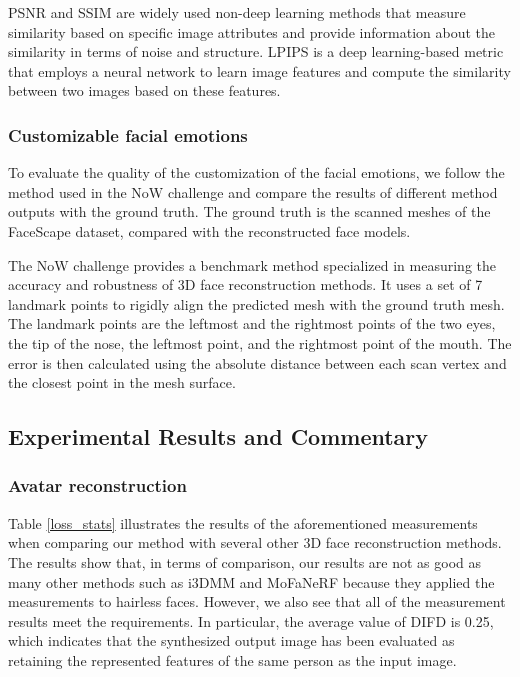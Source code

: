 PSNR and SSIM are widely used non-deep learning methods that measure similarity based on specific image attributes and provide information about the similarity in terms of noise and structure.
LPIPS is a deep learning-based metric that employs a neural network to learn image features and compute the similarity between two images based on these features.

\subsubsection{Customizable facial emotions}
To evaluate the quality of the customization of the facial emotions, we follow the method used in the NoW challenge and compare the results of different method outputs with the ground truth. The ground truth is the scanned meshes of the FaceScape dataset, compared with the reconstructed face models.

The NoW challenge provides a benchmark method specialized in measuring the accuracy and robustness of 3D face reconstruction methods. It uses a set of 7 landmark points to rigidly align the predicted mesh with the ground truth mesh. The landmark points are the leftmost and the rightmost points of the two eyes, the tip of the nose, the leftmost point, and the rightmost point of the mouth. The error is then calculated using the absolute distance between each scan vertex and the closest point in the mesh surface.


\subsection{Experimental Results and Commentary}
\subsubsection{Avatar reconstruction}

Table \ref{loss_stats} illustrates the results of the aforementioned measurements when comparing our method with several other 3D face reconstruction methods. The results show that, in terms of comparison, our results are not as good as many other methods such as i3DMM and MoFaNeRF because they applied the measurements to hairless faces. However, we also see that all of the measurement results meet the requirements. In particular, the average value of DIFD is 0.25, which indicates that the synthesized output image has been evaluated as retaining the represented features of the same person as the input image.


